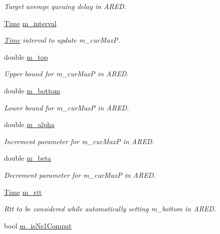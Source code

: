 \begin{DoxyCompactItemize}
\begin{DoxyCompactList}\small\item\em Target average queuing delay in A\+R\+ED. \end{DoxyCompactList}\item 
\hyperlink{classns3_1_1Time}{Time} \hyperlink{classns3_1_1RedQueueDisc_a2b9b3cdf14386d08677f62199489d688}{m\+\_\+interval}
\begin{DoxyCompactList}\small\item\em \hyperlink{classns3_1_1Time}{Time} interval to update m\+\_\+cur\+MaxP. \end{DoxyCompactList}\item 
double \hyperlink{classns3_1_1RedQueueDisc_a6df2255795fef0607a0e5ea99d9bf3f3}{m\+\_\+top}
\begin{DoxyCompactList}\small\item\em Upper bound for m\+\_\+cur\+MaxP in A\+R\+ED. \end{DoxyCompactList}\item 
double \hyperlink{classns3_1_1RedQueueDisc_a9a3204c76843c255e25de29ecca1a0b1}{m\+\_\+bottom}
\begin{DoxyCompactList}\small\item\em Lower bound for m\+\_\+cur\+MaxP in A\+R\+ED. \end{DoxyCompactList}\item 
double \hyperlink{classns3_1_1RedQueueDisc_a223d0381a0e067df135de67e1b261174}{m\+\_\+alpha}
\begin{DoxyCompactList}\small\item\em Increment parameter for m\+\_\+cur\+MaxP in A\+R\+ED. \end{DoxyCompactList}\item 
double \hyperlink{classns3_1_1RedQueueDisc_a7a31e5c2df52ee2da677fd6a4c4ff585}{m\+\_\+beta}
\begin{DoxyCompactList}\small\item\em Decrement parameter for m\+\_\+cur\+MaxP in A\+R\+ED. \end{DoxyCompactList}\item 
\hyperlink{classns3_1_1Time}{Time} \hyperlink{classns3_1_1RedQueueDisc_a0944decd57a23297aaa1fa0d4cbb0e7b}{m\+\_\+rtt}
\begin{DoxyCompactList}\small\item\em Rtt to be considered while automatically setting m\+\_\+bottom in A\+R\+ED. \end{DoxyCompactList}\item 
bool \hyperlink{classns3_1_1RedQueueDisc_a9586d035322ac6e72918bc884a5b017e}{m\+\_\+is\+Ns1\+Compat}

\end{DoxyCompactItemize}
